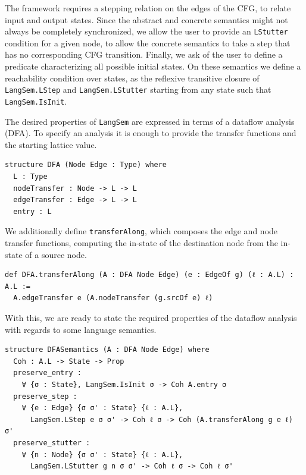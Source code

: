 \documentclass[runningheads]{llncs}
\newcommand{\lean}[1]{\lstinline[language=Lean]|#1|}
\begin{document}
The framework requires a stepping relation on the edges of the CFG, to relate input and output states. Since the abstract and concrete semantics might not always be completely synchronized, we allow the user to provide an \lean{LStutter} condition for a given node, to allow the concrete semantics to take a step that has no corresponding CFG transition. Finally, we ask of the user to define a predicate characterizing all possible initial states. On these semantics we define a reachability condition over states, as the reflexive transitive closure of \lean{LangSem.LStep} and \lean{LangSem.LStutter} starting from any state such that \lean{LangSem.IsInit}.

The desired properties of \lean{LangSem} are expressed in terms of a dataflow analysis (DFA). To specify an analysis it is enough to provide the transfer functions and the starting lattice value.

\begin{lstlisting}[language=Lean]
structure DFA (Node Edge : Type) where
  L : Type
  nodeTransfer : Node -> L -> L
  edgeTransfer : Edge -> L -> L
  entry : L
\end{lstlisting}

We additionally define \lean{transferAlong}, which composes the edge and node transfer functions, computing the in-state of the destination node from the in-state of a source node.

\begin{lstlisting}[language=Lean]
def DFA.transferAlong (A : DFA Node Edge) (e : EdgeOf g) (ℓ : A.L) : A.L :=
  A.edgeTransfer e (A.nodeTransfer (g.srcOf e) ℓ)
\end{lstlisting}

With this, we are ready to state the required properties of the dataflow analysis with regards to some language semantics.

\begin{lstlisting}[language=Lean]
structure DFASemantics (A : DFA Node Edge) where
  Coh : A.L -> State -> Prop
  preserve_entry :
    ∀ {σ : State}, LangSem.IsInit σ -> Coh A.entry σ
  preserve_step :
    ∀ {e : Edge} {σ σ' : State} {ℓ : A.L},
      LangSem.LStep e σ σ' -> Coh ℓ σ -> Coh (A.transferAlong g e ℓ) σ'
  preserve_stutter :
    ∀ {n : Node} {σ σ' : State} {ℓ : A.L},
      LangSem.LStutter g n σ σ' -> Coh ℓ σ -> Coh ℓ σ'
\end{lstlisting}
\end{document}
